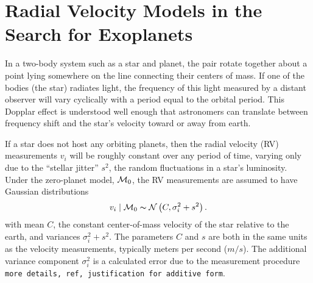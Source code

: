 
\section{Radial Velocity Models in the Search for Exoplanets}
\label{sec:exo}

In a two-body system such as a star and planet, the pair rotate
together about a point lying somewhere on the line connecting their
centers of mass. If one of the bodies (the star) radiates light, the
frequency of this light measured by a distant observer will
 vary  cyclically with a period equal to the orbital period. This
Dopplar effect is understood well enough that astronomers can
translate between frequency shift and the star's velocity toward or
away from earth.  

If a star does not host any orbiting planets, then the radial velocity
(RV) measurements $v_i$ will be roughly constant over any period of time,
varying only due to the ``stellar jitter'' $s^2$, the random
fluctuations in a star's luminosity. Under the zero-planet
model, ${\cal{M}}_0$, the RV measurements are assumed to  have Gaussian distributions
\begin{equation}\label{0p_Model}
v_i \mid \M_0\ind \mathcal{N}\left(C,\sigma_i^2+s^2\right).
\end{equation}
with mean $C$, the constant center-of-mass velocity of the star
relative to the earth, and variances $\sigma^2_i + s^2$.  The
parameters $C$ and $s$ are both in the same units as the velocity
measurements, typically meters per second ($m/s$).  The additional
variance component $\sigma^2_i$ is a calculated error due to the
measurement procedure {\tt more
  details, ref, justification for additive form}.


